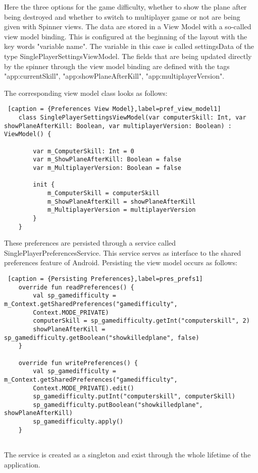 Here the three options for the game difficulty, whether to show the plane after being destroyed and whether to switch to multiplayer game or not are being given with Spinner views. The data are stored in a View Model with a so-called view model binding. This is configured at the beginning of the layout with the key words "variable name". The variable in this case is called settingsData of the type SinglePlayerSettingsViewModel. The fields that are being updated directly by the spinner through the view model binding are defined with the tags "app:currentSkill", "app:showPlaneAfterKill", "app:multiplayerVersion". 

The corresponding view model class looks as follows:

\begin{lstlisting} [caption = {Preferences View Model},label=pref_view_model1]
	class SinglePlayerSettingsViewModel(var computerSkill: Int, var showPlaneAfterKill: Boolean, var multiplayerVersion: Boolean) : ViewModel() {
		
		var m_ComputerSkill: Int = 0
		var m_ShowPlaneAfterKill: Boolean = false
		var m_MultiplayerVersion: Boolean = false
		
		init {
			m_ComputerSkill = computerSkill
			m_ShowPlaneAfterKill = showPlaneAfterKill
			m_MultiplayerVersion = multiplayerVersion
		}
	}
\end{lstlisting}

These preferences are persisted through a service called SinglePlayerPreferencesService. This service serves as interface to the shared preferences feature of Android. Persisting the view model occurs as follows:

\begin{lstlisting} [caption = {Persisting Preferences},label=pres_prefs1]
	override fun readPreferences() {
		val sp_gamedifficulty = m_Context.getSharedPreferences("gamedifficulty",
		Context.MODE_PRIVATE)
		computerSkill = sp_gamedifficulty.getInt("computerskill", 2)
		showPlaneAfterKill = sp_gamedifficulty.getBoolean("showkilledplane", false)
	}
	
	override fun writePreferences() {
		val sp_gamedifficulty = m_Context.getSharedPreferences("gamedifficulty",
		Context.MODE_PRIVATE).edit()
		sp_gamedifficulty.putInt("computerskill", computerSkill)
		sp_gamedifficulty.putBoolean("showkilledplane", showPlaneAfterKill)
		sp_gamedifficulty.apply()
	}
	
\end{lstlisting}

The service is created as a singleton and exist through the whole lifetime of the application.

